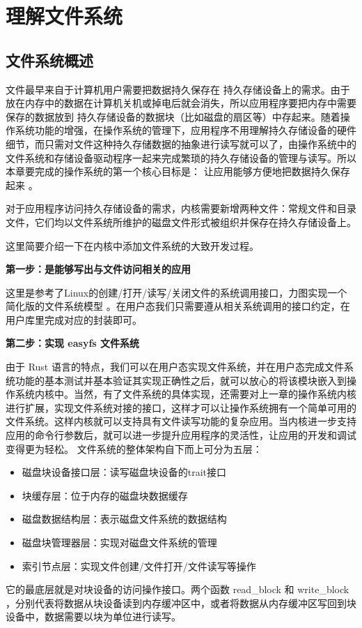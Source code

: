 \chapter{理解文件系统}




\section{文件系统概述}
文件最早来自于计算机用户需要把数据持久保存在 持久存储设备上的需求。由于放在内存中的数据在计算机关机或掉电后就会消失，所以应用程序要把内存中需要保存的数据放到 持久存储设备的数据块（比如磁盘的扇区等）中存起来。随着操作系统功能的增强，在操作系统的管理下，应用程序不用理解持久存储设备的硬件细节，而只需对文件这种持久存储数据的抽象进行读写就可以了，由操作系统中的文件系统和存储设备驱动程序一起来完成繁琐的持久存储设备的管理与读写。所以本章要完成的操作系统的第一个核心目标是： 让应用能够方便地把数据持久保存起来 。

对于应用程序访问持久存储设备的需求，内核需要新增两种文件：常规文件和目录文件，它们均以文件系统所维护的磁盘文件形式被组织并保存在持久存储设备上。

这里简要介绍一下在内核中添加文件系统的大致开发过程。

\textbf{第一步：是能够写出与文件访问相关的应用}

这里是参考了Linux的创建/打开/读写/关闭文件的系统调用接口，力图实现一个简化版的文件系统模型 。在用户态我们只需要遵从相关系统调用的接口约定，在用户库里完成对应的封装即可。

\textbf{第二步：实现 easyfs 文件系统}

由于 Rust 语言的特点，我们可以在用户态实现文件系统，并在用户态完成文件系统功能的基本测试并基本验证其实现正确性之后，就可以放心的将该模块嵌入到操作系统内核中。当然，有了文件系统的具体实现，还需要对上一章的操作系统内核进行扩展，实现文件系统对接的接口，这样才可以让操作系统拥有一个简单可用的文件系统。这样内核就可以支持具有文件读写功能的复杂应用。当内核进一步支持应用的命令行参数后，就可以进一步提升应用程序的灵活性，让应用的开发和调试变得更为轻松。
文件系统的整体架构自下而上可分为五层：
\begin{itemize}
    \item 磁盘块设备接口层：读写磁盘块设备的trait接口
    \item 块缓存层：位于内存的磁盘块数据缓存
    \item 磁盘数据结构层：表示磁盘文件系统的数据结构
    \item 磁盘块管理器层：实现对磁盘文件系统的管理
    \item 索引节点层：实现文件创建/文件打开/文件读写等操作
\end{itemize}
它的最底层就是对块设备的访问操作接口。两个函数 read\_block 和 write\_block ，分别代表将数据从块设备读到内存缓冲区中，或者将数据从内存缓冲区写回到块设备中，数据需要以块为单位进行读写。

